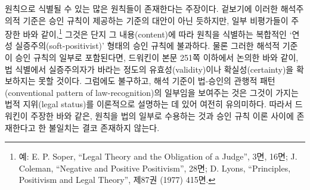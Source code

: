 원칙으로 식별될 수 있는 많은 원칙들이 존재한다는 주장이다. 겉보기에
이러한 해석주의적 기준은 승인 규칙이 제공하는 기준의 대안이 아닌
듯하지만, 일부 비평가들이 주장한 바와 같이,\footnote{예: E. P. Soper,
  ``Legal Theory and the Obligation of a Judge'',  3면, 16면;
  J. Coleman, ``Negative and Positive Positivism'',  28면; D.
  Lyons, ``Principles, Positivism and Legal Theory'',  제87권 (1977) 415면.} 그것은 단지 그 내용(content)에 따라
원칙을 식별하는 복합적인 `연성 실증주의(soft-positivist)' 형태의 승인
규칙에 불과하다. 물론 그러한 해석적 기준이 승인 규칙의 일부로
포함된다면, 드워킨이 본문 251쪽 이하에서 논의한 바와 같이, 법 식별에서
실증주의자가 바라는 정도의 유효성(validity)이나 확실성(certainty)을
확보하지는 못할 것이다. 그럼에도 불구하고, 해석 기준이 법-승인의 관행적
패턴(conventional pattern of law-recognition)의 일부임을 보여주는 것은
그것이 가지는 법적 지위(legal status)를 이론적으로 설명하는 데 있어
여전히 유의미하다. 따라서 드워킨이 주장한 바와 같은, 원칙을 법의 일부로
수용하는 것과 승인 규칙 이론 사이에 존재한다고 한 불일치는 결코 존재하지
않는다.

